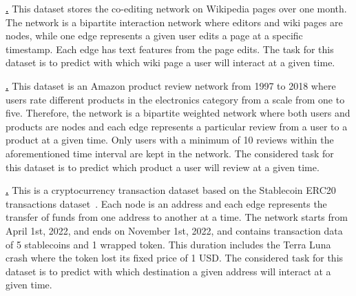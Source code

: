 


\underline{\textbf{\wikipedia.}} This dataset stores the co-editing network on Wikipedia pages over one month. The network is a bipartite interaction network where editors and wiki pages are nodes, while one edge represents a given user edits a page at a specific timestamp. Each edge has text features from the page edits.  
The task for this dataset is to predict with which wiki page a user will interact at a given time. 


\underline{\textbf{\review.}} This dataset is an Amazon product review network from 1997 to 2018 where users rate different products in the electronics category from a scale from one to five. Therefore, the network is a bipartite weighted network where both users and products are nodes and each edge represents a particular review from a user to a product at a given time. Only users with a minimum of 10 reviews within the aforementioned time interval are kept in the network. The considered task for this dataset is to predict which product a user will review at a given time. 

\underline{\textbf{\coin.}} This is a cryptocurrency transaction dataset based on the Stablecoin ERC20 transactions dataset~\cite{chartalistNeurips2022}. Each node is an address and each edge represents the transfer of funds from one address to another at a time. The network starts from April 1st, 2022, and ends on November 1st, 2022, and contains transaction data of 5 stablecoins and 1 wrapped token. This duration includes the Terra Luna crash where the token lost its fixed price of 1 USD.  The considered task for this dataset is to predict with which destination a given address will interact at a given time.



